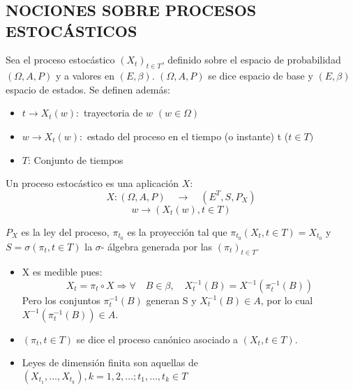 \appendix

\chapter{}
\section{NOCIONES SOBRE PROCESOS ESTOC\'{A}STICOS}

Sea el proceso estoc\'{a}stico $\left( {X_{t} } \right)_{t\in T}$, definido sobre el espacio de probabilidad $(\Omega ,A ,P)$ y a valores en $(E,\beta )$. $(\Omega ,A ,P)$ se dice espacio de base y $(E,\beta )$ espacio de estados. Se definen adem\'{a}s:

\begin{itemize}
\item $t\to X_{t} \left( w \right):$ trayectoria de $w$ $\left( {w\in \Omega } \right)$
\item $w\to X_{t} \left( w \right):$ estado del proceso en el tiempo (o instante) t ($t\in T)$
\item $T$: Conjunto de tiempos
\end{itemize}

Un proceso estoc\'{a}stico es una aplicaci\'{o}n $X$:
\[
X: (\Omega ,A ,P) \quad \to\quad (E^{T}, S ,P_{X} )
\]
\[
w\to \left( {X_{t} \left( w \right),t\in T} \right)
\]

$P_{X}$ es la ley del proceso, $\pi_{t_{0}}$ es la proyecci\'{o}n tal que $\pi_{t_{0} } \left( {X_{t} , t\in T} \right)=X_{t_{0} }$ y $S=\sigma \left( {\pi_{t}, t\in T} \right)$ la $\sigma$- \'{a}lgebra generada por las $\left( {\pi_{t} } \right)_{t\in T} $.

\begin{itemize}
      \item X es medible pues: 
\[
X_{t} =\pi_{t} \circ X\Rightarrow \forall \quad B\in \beta,\quad X_{t}^{-1} \left( B \right)=X^{-1}\left( {\pi_{t}^{-1} \left( B \right)} \right)
\]
Pero los conjuntos $\pi_{t}^{-1} (B)$ generan S y $X_{t}^{-1} (B)\in A$, por lo cual $X^{-1} (\pi_{t}^{-1} (B))\in A$.
      
      \item $\left( {\pi_{t}, t\in T} \right)$ se dice el proceso can\'{o}nico asociado a $\left( {X_{t}, t\in T} \right)$.
      \item Leyes de dimensi\'{o}n finita son aquellas de $\left( {X_{t_{1} } ,\ldots, X_{t_{k} } } \right), k=1,2, \ldots;t_{1},\ldots,t_{k} \in T$
\end{itemize}

